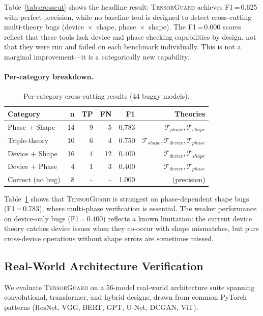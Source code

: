 \documentclass[10pt]{article}
\newcommand{\tguard}{\textsc{TensorGuard}}
\newcommand{\Tshape}{\mathcal{T}_{\mathit{shape}}}
\newcommand{\Tdevice}{\mathcal{T}_{\mathit{device}}}
\newcommand{\Tphase}{\mathcal{T}_{\mathit{phase}}}
\theoremstyle{plain}
\theoremstyle{definition}
\theoremstyle{remark}
\begin{document}
Table~\ref{tab:crosscut} shows the headline result: \tguard{}
achieves F1\,=\,0.625 with perfect precision, while no baseline
tool is designed to detect cross-cutting multi-theory bugs
(device~$\times$~shape, phase~$\times$~shape).  The F1\,=\,0.000
scores reflect that these tools lack device and phase checking
capabilities by design, not that they were run and failed on each
benchmark individually.  This is not a marginal improvement---it is a
categorically new capability.

\paragraph{Per-category breakdown.}

\begin{table}[t]
\centering
\caption{Per-category cross-cutting results (44 buggy models).}
\label{tab:crosscut-cat}
\small
\begin{tabular}{@{}lrrrrr@{}}
\toprule
\textbf{Category} & \textbf{n} & \textbf{TP} & \textbf{FN} &
  \textbf{F1} & \textbf{Theories} \\
\midrule
Phase $+$ Shape       & 14 & 9  & 5  & 0.783 & $\Tphase, \Tshape$ \\
Triple-theory         & 10 & 6  & 4  & 0.750 & $\Tshape, \Tdevice, \Tphase$ \\
Device $+$ Shape      & 16 & 4  & 12 & 0.400 & $\Tdevice, \Tshape$ \\
Device $+$ Phase      &  4 & 1  & 3  & 0.400 & $\Tdevice, \Tphase$ \\
Correct (no bug)      &  8 & -- & -- & 1.000 & (precision) \\
\bottomrule
\end{tabular}
\end{table}

Table~\ref{tab:crosscut-cat} shows that \tguard{} is strongest on
phase-dependent shape bugs (F1\,=\,0.783), where multi-phase
verification is essential.  The weaker performance on device-only
bugs (F1\,=\,0.400) reflects a known limitation: the current device
theory catches device issues when they co-occur with shape mismatches,
but pure cross-device operations without shape errors are sometimes
missed.

\subsection{Real-World Architecture Verification}

We evaluate \tguard{} on a 56-model real-world architecture suite
spanning convolutional, transformer, and hybrid designs, drawn from
common PyTorch patterns (ResNet, VGG, BERT, GPT, U-Net, DCGAN, ViT).
\end{document}
